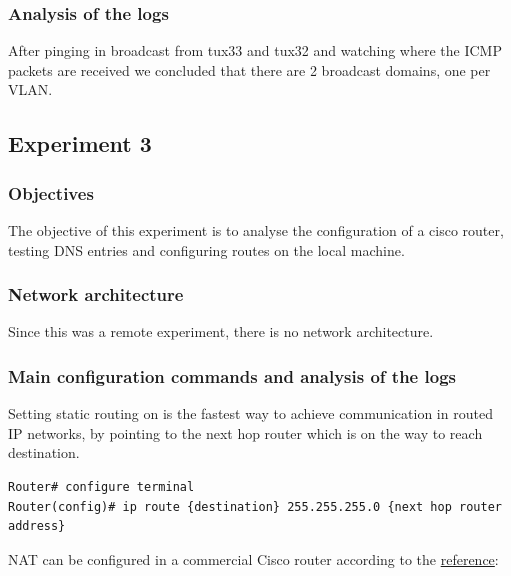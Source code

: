 \documentclass[a4paper,11pt,english]{article}
\begin{document}
        \subsubsection{Analysis of the logs}
            After pinging in broadcast from tux33 and tux32 and watching where the ICMP packets
            are received we concluded that there are 2 broadcast domains, one per VLAN.


    \subsection{Experiment 3}
        \subsubsection{Objectives}
            The objective of this experiment is to analyse the configuration of a cisco router,
            testing DNS entries and configuring routes on the local machine.

        \subsubsection{Network architecture}
            Since this was a remote experiment, there is no network architecture.

        \subsubsection{Main configuration commands and analysis of the logs}
            
            Setting static routing on is the fastest way to achieve communication in routed IP networks,
            by pointing to the next hop router which is on the way to reach destination.

\begin{lstlisting}
Router# configure terminal
Router(config)# ip route {destination} 255.255.255.0 {next hop router address}
\end{lstlisting}       
 

            \noindent NAT can be configured in a commercial Cisco router according to the \href{https://www.cisco.com/c/en/us/td/docs/ios-xml/ios/ipaddr_nat/configuration/xe-16/nat-xe-16-book/iadnat-addr-consv.html}{reference}:
\end{document}
